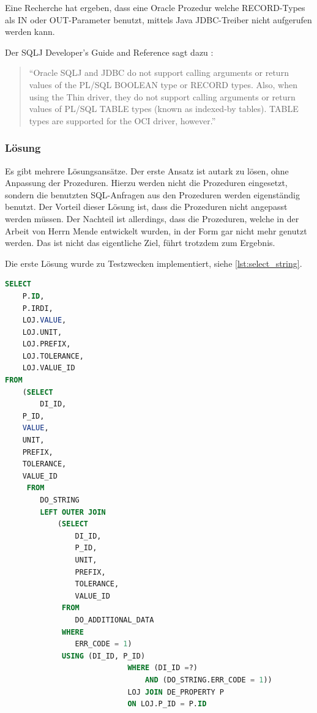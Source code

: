 Eine Recherche hat ergeben, dass eine Oracle Prozedur welche RECORD-Types als IN oder OUT-Parameter benutzt, mittels Java JDBC-Treiber nicht aufgerufen werden kann. 

Der SQLJ Developer's Guide and Reference sagt dazu \citep[Kap. 5][]{oracle-dev-guide}:

\begin{quotation}
\enquote{Oracle SQLJ and JDBC do not support calling arguments or return values of the PL/SQL BOOLEAN type or RECORD types. Also, when using the Thin driver, they do not support calling arguments or return values of PL/SQL TABLE types (known as indexed-by tables). TABLE types are supported for the OCI driver, however.}
\end{quotation}

\subsubsection{Lösung}

Es gibt mehrere Lösungsansätze. Der erste Ansatz ist autark zu lösen, ohne Anpassung der Prozeduren. Hierzu werden nicht die Prozeduren eingesetzt, sondern die benutzten SQL-Anfragen aus den Prozeduren werden eigenständig benutzt. 
Der Vorteil dieser Lösung ist, dass die Prozeduren nicht angepasst werden müssen. Der Nachteil ist allerdings, dass die Prozeduren, welche in der Arbeit von Herrn Mende entwickelt wurden, in der Form gar nicht mehr genutzt werden. Das ist nicht das eigentliche Ziel, führt trotzdem zum Ergebnis. 

Die erste Lösung wurde zu Testzwecken implementiert, siehe \autoref{lst:select_string}.

\begin{lstlisting}[caption=SELECT-Abfrage für String-Properties aus den Prozeduren, language=sql, label=lst:select_string]
SELECT 
    P.ID, 
    P.IRDI, 
    LOJ.VALUE, 
    LOJ.UNIT, 
    LOJ.PREFIX, 
    LOJ.TOLERANCE, 
    LOJ.VALUE_ID 
FROM 
    (SELECT 
    	DI_ID, 
	P_ID, 
	VALUE, 
	UNIT, 
	PREFIX, 
	TOLERANCE, 
	VALUE_ID
     FROM 
     	DO_STRING 
		LEFT OUTER JOIN 
			(SELECT 
				DI_ID, 
				P_ID, 
				UNIT, 
				PREFIX, 
				TOLERANCE, 
				VALUE_ID
			 FROM 
			 	DO_ADDITIONAL_DATA 
			 WHERE 
			 	ERR_CODE = 1)
			 USING (DI_ID, P_ID)
                          	WHERE (DI_ID =?) 
                          		AND (DO_STRING.ERR_CODE = 1))
                          	LOJ JOIN DE_PROPERTY P  
                          	ON LOJ.P_ID = P.ID
\end{lstlisting}

